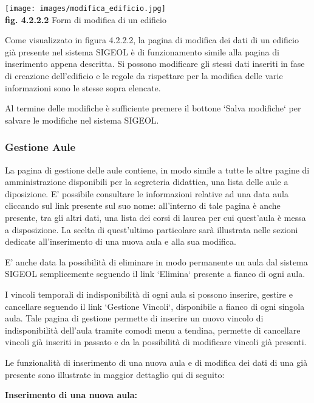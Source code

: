 \documentclass[11pt,a4paper]{article}
\begin{document}
\begin{center}
	\texttt{[image: images/modifica\_edificio.jpg]}\\
	\textbf{fig. 4.2.2.2} Form di modifica di un edificio\\
\end{center}

Come visualizzato in figura 4.2.2.2, la pagina di modifica dei dati di un edificio già presente nel sistema SIGEOL è di funzionamento simile alla pagina di inserimento appena descritta. Si possono modificare gli stessi dati inseriti in fase di creazione dell'edificio e le regole da rispettare per la modifica delle varie informazioni sono le stesse sopra elencate.

Al termine delle modifiche è sufficiente premere il bottone `Salva modifiche` per salvare le modifiche nel sistema SIGEOL.
\subsubsection{Gestione Aule}
La pagina di gestione delle aule contiene, in modo simile a tutte le altre pagine di amministrazione disponibili per la segreteria didattica, una lista delle aule a diposizione.
E' possibile consultare le informazioni relative ad una data aula cliccando sul link presente sul suo nome: all'interno di tale pagina è anche presente, tra gli altri dati, una lista dei corsi di laurea per cui quest'aula è messa a disposizione. La scelta di quest'ultimo particolare sarà illustrata nelle sezioni dedicate all'inserimento di una nuova aula e alla sua modifica.

E' anche data la possibilità di eliminare in modo permanente un aula dal sistema SIGEOL semplicemente seguendo il link `Elimina` presente a fianco di ogni aula.

I vincoli temporali di indisponibilità di ogni aula si possono inserire, gestire e cancellare seguendo il link `Gestione Vincoli`, disponibile a fianco di ogni singola aula. Tale pagina di gestione permette di inserire un nuovo vincolo di indisponibilità dell'aula tramite comodi menu a tendina, permette di cancellare vincoli già inseriti in passato e da la possibilità di modificare vincoli già presenti.

Le funzionalità di inserimento di una nuova aula e di modifica dei dati di una già presente sono illustrate in maggior dettaglio qui di seguito:
\newline \newline
\begin{large}\textbf{Inserimento di una nuova aula:}\end{large}
\end{document}
